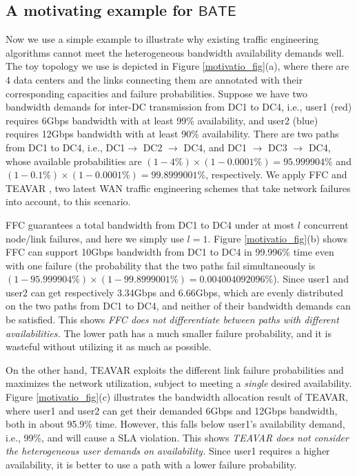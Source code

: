 \documentclass[sigconf]{acmart}
\begin{document}
\subsection{A motivating example for $\mathsf{BATE}$}
Now we use a simple example to illustrate why existing traffic engineering algorithms cannot 
meet the heterogeneous bandwidth availability demands well. The toy topology we use is depicted 
in Figure \ref{motivatio_fig}(a), where there are 4 data centers and the links connecting them 
are annotated with their corresponding capacities and failure probabilities. Suppose we have two 
bandwidth demands for inter-DC transmission from DC1 to DC4, i.e., user1 (red) requires 6Gbps bandwidth 
with at least 99\% availability, and user2 (blue) requires 12Gbps bandwidth with at least 90\% availability. 
There are two paths from DC1 to DC4, i.e., DC1$\to$ DC2 $\to$ DC4, and DC1 $\to$ DC3 $\to$ DC4, whose available probabilities are $(1-4\%) \times (1-0.0001\%)=95.999904\%$ and $(1-0.1\%) \times (1-0.0001\%) = 99.8999001\%$, respectively. We apply FFC \cite{FFC} and TEAVAR \cite{Teavar}, two latest WAN traffic engineering schemes that take network failures into account, to this scenario. 

FFC \cite{FFC} guarantees a total bandwidth from DC1 to DC4 under at most $l$ concurrent node/link failures, and here we simply use $l=1$. Figure \ref{motivatio_fig}(b) shows FFC can support 10Gbps bandwidth from DC1 to DC4 in 99.996\% time even with one failure (the probability that the two paths fail simultaneously is $(1-95.999904\%) \times (1-99.8999001\%) = 0.004004092096\%$). Since user1 and user2 can get respectively 3.34Gbps and 6.66Gbps, which are evenly distributed on the two paths from DC1 to DC4, 
and neither of their bandwidth demands can be satisfied. This shows \textit{FFC does not differentiate between paths with different availabilities.} The lower path has a much smaller failure probability, and it is wasteful without utilizing it as much as possible. 

On the other hand, TEAVAR \cite{Teavar} exploits the different link failure probabilities and maximizes the network utilization, subject to meeting a \textit{single} desired availability. Figure \ref{motivatio_fig}(c) illustrates the bandwidth allocation result of TEAVAR, where user1 and user2 can get their demanded 6Gbps and 12Gbps bandwidth, both in about 95.9\% time. However, this falls below 
user1's availability demand, i.e., 99\%, and will cause a SLA violation. 
This shows  \textit{TEAVAR does not consider the heterogeneous user demands on availability.} 
Since user1 requires a higher availability, it is better to use a path with a lower failure probability. 
\end{document}
